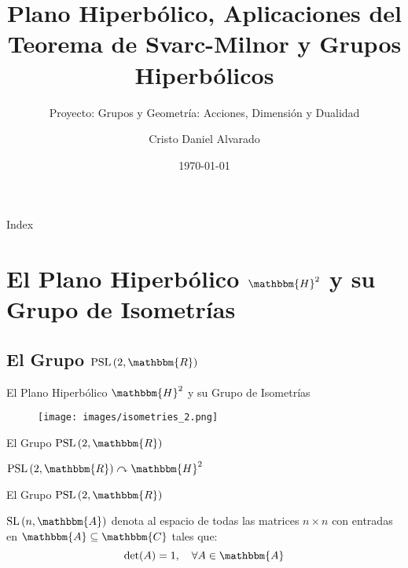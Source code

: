 \documentclass[xcolor=dvipsnames]{beamer}
\subtitle{Proyecto: Grupos y Geometría: Acciones, Dimensión y Dualidad}
\title{Plano Hiperbólico, Aplicaciones del Teorema de Svarc-Milnor y Grupos Hiperbólicos}
\author{Cristo Daniel Alvarado}
\institute
{
    Escuela Superior de Física y Matemáticas \\
    Instituto Politécnico Nacional
}
\date{\today} %
\theoremstyle{largebreak}
\newcommand{\bbm}[1]{\ensuremath{\mathbbm{#1}}}
\newcommand{\SL}[1]{\ensuremath{\textup{SL}\left(#1\right)}}
\newcommand{\PSL}[1]{\ensuremath{\textup{PSL}\left(#1\right)}}
\begin{document}
\begin{frame}
    \titlepage
\end{frame}

\begin{frame}{Index}
    \tableofcontents
\end{frame}

\section{El Plano Hiperbólico $\bbm{H}^2$ y su Grupo de Isometrías}

\subsection{El Grupo $\PSL{2,\bbm{R}}$}

\begin{frame}
    \begin{center}
        \Huge{El Plano Hiperbólico $\bbm{H}^2$ y su Grupo de Isometrías}
    \end{center}
    \begin{figure}
        \begin{center}
            \texttt{[image: images/isometries\_2.png]}
        \end{center}
    \end{figure}
\end{frame}

\begin{frame}
    \begin{center}
        \Large El Grupo $\PSL{2,\bbm{R}}$

        \hfill\break
        \pause
        \Huge$\PSL{2,\bbm{R}}\curvearrowright\bbm{H}^2$
    \end{center}
\end{frame}

\begin{frame}{El Grupo $\PSL{2,\bbm{R}}$}
    \begin{mydef}
        $\SL{n,\bbm{A}}$ denota al espacio de todas las matrices $n\times n$ con entradas en $\bbm{A}\subseteq\bbm{C}$ tales que:
        \begin{equation*}
            \det(A)=1,\quad\forall A\in\bbm{A}
        \end{equation*}
    \end{mydef}
\end{frame}
\end{document}
